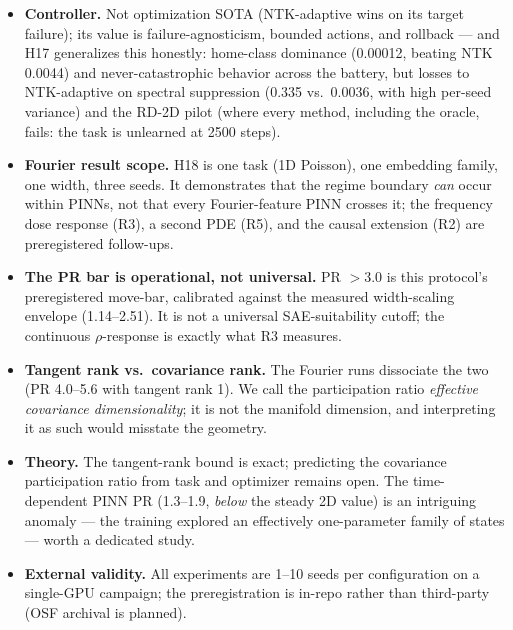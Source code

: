 \documentclass{article}
\begin{document}
\begin{itemize}
        \emph{chronic} in the starvation regime (75–100\% of steps),
        so the binary conflict label has little within-run variation
        there; a continuous-magnitude redesign is registered future
        work. A duplicated-step logging artifact that initially produced
        degenerate $\rho = \pm 1$ values was caught and fixed before
        the verdict was read.
  \item \textbf{Controller.} Not optimization SOTA (NTK-adaptive wins on
        its target failure); its value is failure-agnosticism, bounded
        actions, and rollback --- and H17 generalizes this honestly:
        home-class dominance (0.00012, beating NTK 0.0044) and
        never-catastrophic behavior across the battery, but losses to
        NTK-adaptive on spectral suppression (0.335 vs.\ 0.0036, with
        high per-seed variance) and the RD-2D pilot (where every method,
        including the oracle, fails: the task is unlearned at 2500 steps).
  \item \textbf{Fourier result scope.} H18 is one task (1D Poisson),
        one embedding family, one width, three seeds. It demonstrates
        that the regime boundary \emph{can} occur within PINNs, not
        that every Fourier-feature PINN crosses it; the frequency dose
        response (R3), a second PDE (R5), and the causal extension (R2)
        are preregistered follow-ups.
  \item \textbf{The PR bar is operational, not universal.} PR $> 3.0$
        is this protocol's preregistered move-bar, calibrated against
        the measured width-scaling envelope (1.14--2.51). It is not a
        universal SAE-suitability cutoff; the continuous
        $\rho$-response is exactly what R3 measures.
  \item \textbf{Tangent rank vs.\ covariance rank.} The Fourier runs
        dissociate the two (PR 4.0--5.6 with tangent rank 1). We call
        the participation ratio \emph{effective covariance
        dimensionality}; it is not the manifold dimension, and
        interpreting it as such would misstate the geometry.
  \item \textbf{Theory.} The tangent-rank bound is exact; predicting the
        covariance participation ratio from task and optimizer remains
        open. The time-dependent PINN PR (1.3--1.9, \emph{below} the
        steady 2D value) is an intriguing anomaly --- the training
        explored an effectively one-parameter family of states --- worth
        a dedicated study.
  \item \textbf{External validity.} All experiments are 1--10 seeds per
        configuration on a single-GPU campaign; the preregistration is
        in-repo rather than third-party (OSF archival is planned).
\end{itemize}
\end{document}
